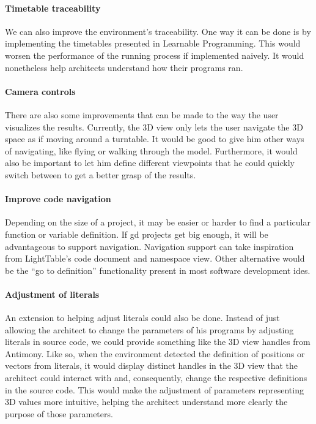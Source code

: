 \paragraph{Timetable traceability}
We can also improve the environment's traceability.
One way it can be done is by implementing the timetables presented in Learnable Programming\cite{victor2012learnable}.
This would worsen the performance of the running process if implemented naively.
It would nonetheless help architects understand how their programs ran.

\paragraph{Camera controls}
There are also some improvements that can be made to the way the user visualizes the results.
Currently, the 3D view only lets the user navigate the 3D space as if moving around a turntable.
It would be good to give him other ways of navigating, like flying or walking through the model.
Furthermore, it would also be important to let him define different viewpoints that he could quickly switch between to get a better grasp of the results.

\paragraph{Improve code navigation}
Depending on the size of a project, it may be easier or harder to find a particular function or variable definition.
If \gls{gd} projects get big enough, it will be advantageous to support navigation.
Navigation support can take inspiration from LightTable's code document and namespace view.
Other alternative would be the ``go to definition'' functionality present in most software development \glspl{ide}.

\paragraph{Adjustment of literals}
An extension to helping adjust literals could also be done.
Instead of just allowing the architect to change the parameters of his programs by adjusting literals in source code, we could provide something like the 3D view handles from Antimony.
Like so, when the environment detected the definition of positions or vectors from literals, it would display distinct handles in the 3D view that the architect could interact with and, consequently, change the respective definitions in the source code.
This would make the adjustment of parameters representing 3D values more intuitive, helping the architect understand more clearly the purpose of those parameters.

